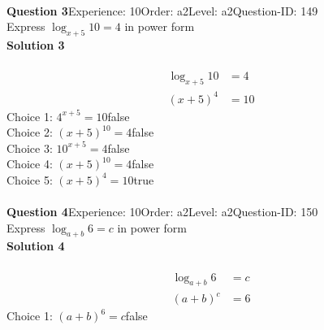 \documentclass{article}
\begin{document}
\\[4pt]
\noindent\textbf{Question 3}\hspace{20pt}Experience: 10\hspace{20pt}Order: a2\hspace{20pt}Level: a2\hspace{20pt}Question-ID: 149\\[2pt]
Express $\log_{x+5}10=4$ in power form\\[4pt]
\noindent\textbf{Solution 3}\\[2pt]
\\[-35pt]\begin{align*}
\log_{x+5}10&=4\\[2pt]
(x+5)^4&=10
\end{align*}
Choice 1: \hspace{20pt}$4^{x+5}=10$\hspace{20pt}false\\
Choice 2: \hspace{20pt}$(x+5)^{10}=4$\hspace{20pt}false\\
Choice 3: \hspace{20pt}$10^{x+5}=4$\hspace{20pt}false\\
Choice 4: \hspace{20pt}$(x+5)^{10}=4$\hspace{20pt}false\\
Choice 5: \hspace{20pt}$(x+5)^4=10$\hspace{20pt}true\\
\\[4pt]
\noindent\textbf{Question 4}\hspace{20pt}Experience: 10\hspace{20pt}Order: a2\hspace{20pt}Level: a2\hspace{20pt}Question-ID: 150\\[2pt]
Express $\log_{a+b}6=c$ in power form\\[4pt]
\noindent\textbf{Solution 4}\\[2pt]
\\[-35pt]\begin{align*}
\log_{a+b}6&=c\\[2pt]
(a+b)^c&=6
\end{align*}
Choice 1: \hspace{20pt}$(a+b)^6=c$\hspace{20pt}false\\
\end{document}
